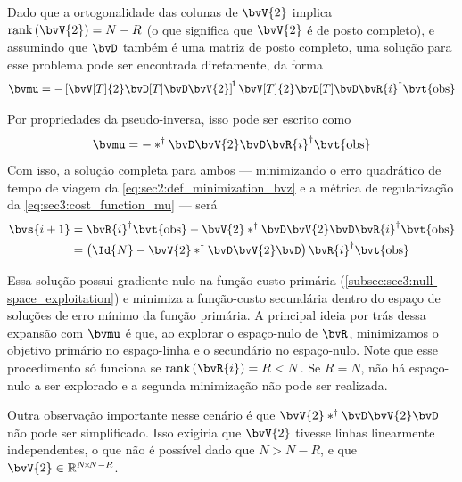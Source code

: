 Dado que a ortogonalidade das colunas de $\bvV{2}$ implica $\rank{\bvV{2}} = N-R$ (o que significa que $\bvV{2}$ é de posto completo), e assumindo que $\bvD$ também é uma matriz de posto completo, uma solução para esse problema pode ser encontrada diretamente, da forma
\begin{equation}
	\bvmu = -\inv*{\bvV[T]{2} \bvD[T] \bvD\bvV{2}} \bvV[T]{2} \bvD[T] \bvD \pinv{\bvR{i}} \bvt{\obs}
\end{equation}

Por propriedades da pseudo-inversa, isso pode ser escrito como
\begin{equation}
	\bvmu = -\pinv*{\bvD \bvV{2}} \bvD \pinv{\bvR{i}} \bvt{\obs}
	\label{eq:sec2:definition_mu_full}
\end{equation}
Com isso, a solução completa para ambos --- minimizando o erro quadrático de tempo de viagem da \cref{eq:sec2:def_minimization_bvz} e a métrica de regularização da \cref{eq:sec3:cost_function_mu} --- será
\begin{equation}
	\begin{split}
		\bvs{i+1}
		& = \pinv{\bvR{i}} \bvt{\obs} - \bvV{2} \pinv*{\bvD \bvV{2}} \bvD \pinv{\bvR{i}} \bvt{\obs} \\
		& = \pts{\Id{N} - \bvV{2} \pinv*{\bvD \bvV{2}} \bvD} \pinv{\bvR{i}} \bvt{\obs}
	\end{split}
	\label{eq:sec2:definition_zi+1_with_mu}
\end{equation}

Essa solução possui gradiente nulo na função-custo primária (\cref{subsec:sec3:null-space_exploitation}) e minimiza a função-custo secundária dentro do espaço de soluções de erro mínimo da função primária. A principal ideia por trás dessa expansão com $\bvmu$ é que, ao explorar o espaço-nulo de $\bvR$, minimizamos o objetivo primário no espaço-linha e o secundário no espaço-nulo. Note que esse procedimento só funciona se $\rank{\bvR{i}} = R < N$. Se $R = N$, não há espaço-nulo a ser explorado e a segunda minimização não pode ser realizada.

Outra observação importante nesse cenário é que $\bvV{2} \pinv*{\bvD \bvV{2}} \bvD$ não pode ser simplificado. Isso exigiria que $\bvV{2}$ tivesse linhas linearmente independentes, o que não é possível dado que $N > N-R$, e que $\bvV{2} \in \re^{\sz{N}{N-R}}$. %

